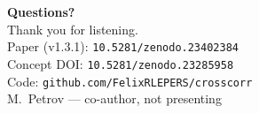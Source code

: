 \documentclass[aspectratio=169,10pt]{beamer}
\begin{document}
\begin{frame}[plain]{}
  \vfill
  \begin{center}
    {\Huge\bfseries Questions?}\\[0.7cm]
    {\large\textcolor{ccdim}{Thank you for listening.}}\\[0.9cm]
    {\small
      Paper (v1.3.1): \texttt{10.5281/zenodo.23402384}\\[4pt]
      Concept DOI: \texttt{10.5281/zenodo.23285958}\\[4pt]
      Code: \texttt{github.com/FelixRLEPERS/crosscorr}\\[4pt]
      M.\ Petrov --- co-author, not presenting}
  \end{center}
  \vfill
\end{frame}
\end{document}
